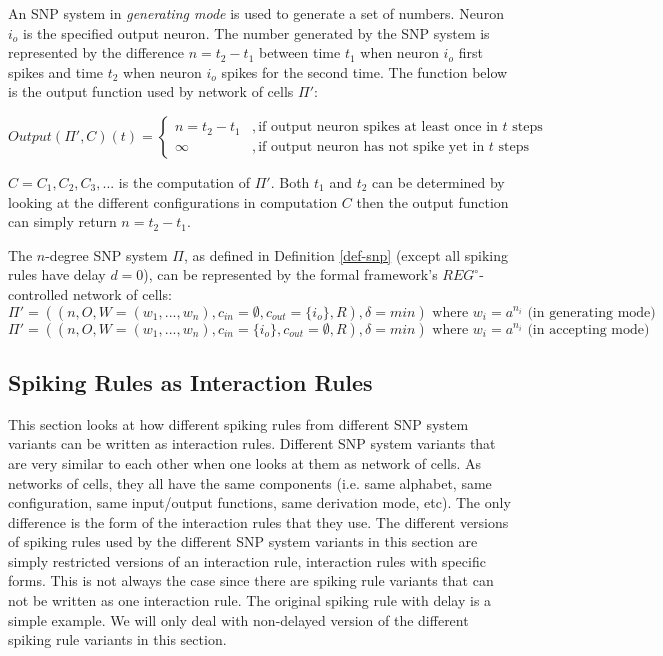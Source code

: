 \documentclass[a4paper]{article}
\theoremstyle{definition}
\begin{document}
An SNP system in \emph{generating mode} is used to generate a set of numbers. Neuron $i_o$ is the
specified output neuron. The number generated by the SNP system is represented by the difference
$n = t_2 - t_1$ between time $t_1$ when neuron $i_o$ first spikes and time $t_2$ when neuron $i_o$
spikes for the second time. The function below is the output function used by network of cells 
$\Pi'$:

\[
Output(\Pi',C)(t) = 
\begin{cases}
n = t_2 - t_1 &, \text{if output neuron spikes at least once in $t$ steps}\\
\infty        &, \text{if output neuron has not spike yet in $t$ steps} 
\end{cases}
\]

$C = C_1, C_2,C_3,...$ is the computation of $\Pi'$. Both $t_1$ and $t_2$ can be determined by 
looking at the different configurations in computation $C$ then the output function can simply 
return $n = t_2 -t_1$. 

The $n$-degree SNP system $\Pi$, as defined in Definition \ref{def-snp} (except all spiking rules 
have delay $d=0$), can be represented by the formal framework's $REG^{\circ}$-controlled network of 
cells:
$$\Pi'= ((n,O,W=(w_1,...,w_n),c_{in}=\emptyset, c_{out}=\{i_o\}, R),\delta=min) 
\text{ where } w_i = a^{n_i} \text{ (in generating mode)}$$ 
$$\Pi'= ((n,O,W=(w_1,...,w_n), c_{in}=\{i_o\}, c_{out}=\emptyset, R),\delta=min) 
\text{ where } w_i = a^{n_i} \text{ (in accepting mode)}$$ 


\subsection{Spiking Rules as Interaction Rules} \label{sec-representation}

This section looks at how different spiking rules from different SNP system variants can be written 
as interaction rules. Different SNP system variants that are very similar to each other when one
looks at them as network of cells. As networks of cells, they all have the same components (i.e. 
same alphabet, same configuration, same input/output functions, same derivation mode, etc). The only 
difference is the form of the interaction rules that they use. The different versions of spiking 
rules used by the different SNP system variants in this section are simply restricted versions of an 
interaction rule, interaction rules with specific forms. This is not always the case since there are
spiking rule variants that can not be written as one interaction rule. The original spiking rule 
with delay is a simple example. We will only deal with non-delayed version of the different spiking 
rule variants in this section.
\end{document}
